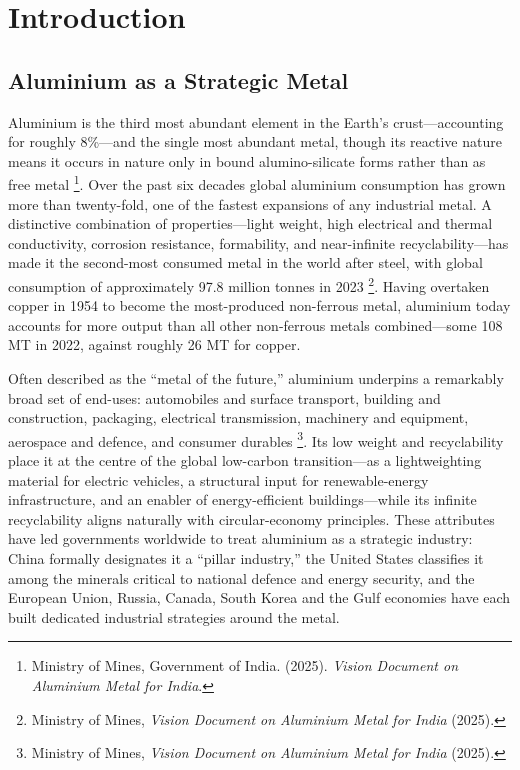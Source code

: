 \documentclass[11pt, a4paper]{article}
\numberwithin{figure}{section}
\numberwithin{table}{section}
\begin{document}
\vspace{1cm}
\tableofcontents
\newpage

\section{Introduction}

\subsection{Aluminium as a Strategic Metal}
Aluminium is the third most abundant element in the Earth's crust---accounting for roughly 8\%---and the single most abundant metal, though its reactive nature means it occurs in nature only in bound alumino-silicate forms rather than as free metal \cite{mom_vision2025}\footnote{Ministry of Mines, Government of India. (2025). \textit{Vision Document on Aluminium Metal for India}.}. Over the past six decades global aluminium consumption has grown more than twenty-fold, one of the fastest expansions of any industrial metal. A distinctive combination of properties---light weight, high electrical and thermal conductivity, corrosion resistance, formability, and near-infinite recyclability---has made it the second-most consumed metal in the world after steel, with global consumption of approximately 97.8 million tonnes in 2023 \cite{mom_vision2025}\footnote{Ministry of Mines, \textit{Vision Document on Aluminium Metal for India} (2025).}. Having overtaken copper in 1954 to become the most-produced non-ferrous metal, aluminium today accounts for more output than all other non-ferrous metals combined---some 108 MT in 2022, against roughly 26 MT for copper.

Often described as the ``metal of the future,'' aluminium underpins a remarkably broad set of end-uses: automobiles and surface transport, building and construction, packaging, electrical transmission, machinery and equipment, aerospace and defence, and consumer durables \cite{mom_vision2025}\footnote{Ministry of Mines, \textit{Vision Document on Aluminium Metal for India} (2025).}. Its low weight and recyclability place it at the centre of the global low-carbon transition---as a lightweighting material for electric vehicles, a structural input for renewable-energy infrastructure, and an enabler of energy-efficient buildings---while its infinite recyclability aligns naturally with circular-economy principles. These attributes have led governments worldwide to treat aluminium as a strategic industry: China formally designates it a ``pillar industry,'' the United States classifies it among the minerals critical to national defence and energy security, and the European Union, Russia, Canada, South Korea and the Gulf economies have each built dedicated industrial strategies around the metal.
\end{document}
